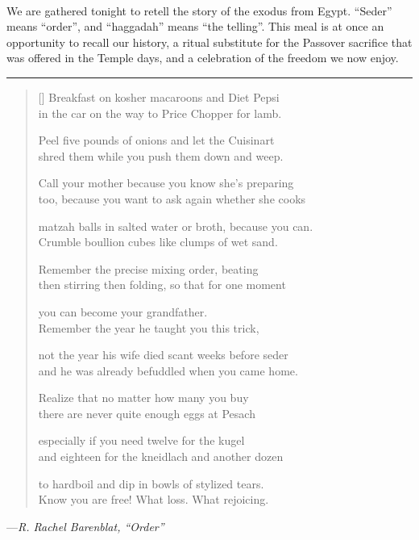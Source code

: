 \documentclass[a4paper,10pt,openany]{memoir}
\newcommand{\HgSource}[1]{\hfill{\small---\itshape{#1}}}
\newcommand{\HgFill}{\vfill \hrule \vfill}
\newenvironment{HgEnglish}{\strut\\\noindent}{\vspace{1em}}
\begin{document}
\begin{HgEnglish}
  We are gathered tonight to retell the story of the exodus from Egypt.
  ``Seder'' means ``order'', and ``haggadah'' means ``the telling''. This meal
  is at once an opportunity to recall our history, a ritual substitute for the
  Passover sacrifice that was offered in the Temple days, and a celebration of
  the freedom we now enjoy.
\end{HgEnglish}

\HgFill

\settowidth{\versewidth}{matzah balls in salted water or broth, because you can.}
\begin{verse}[\versewidth]
  Breakfast on kosher macaroons and Diet Pepsi\\
  in the car on the way to Price Chopper for lamb.

  Peel five pounds of onions and let the Cuisinart\\
  shred them while you push them down and weep.

  Call your mother because you know she’s preparing\\
  too, because you want to ask again whether she cooks

  matzah balls in salted water or broth, because you can.\\
  Crumble boullion cubes like clumps of wet sand.

  Remember the precise mixing order, beating \\
  then stirring then folding, so that for one moment

  you can become your grandfather. \\
  Remember the year he taught you this trick,

  not the year his wife died scant weeks before seder\\
  and he was already befuddled when you came home.

  Realize that no matter how many you buy\\
  there are never quite enough eggs at Pesach

  especially if you need twelve for the kugel \\
  and  eighteen for the kneidlach and another dozen

  to hardboil and dip in bowls of stylized tears.\\
  Know you are free! What loss. What rejoicing.
\end{verse}

\HgSource{R. Rachel Barenblat, ``Order''}
\newpage
\end{document}
